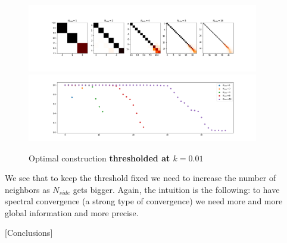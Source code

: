 \begin{figure}[h]
	\label{fig:optimal_thresholded}
	\caption{Optimal construction \textbf{thresholded at $k=0.01$}}
	\centering
	\includegraphics[width=0.9\textwidth]{../codes/02.HeatKernelGraphLaplacian/HEALPix/06_figures/optimal_thresholded.png}	
	\includegraphics[width=0.9\textwidth]{../codes/02.HeatKernelGraphLaplacian/HEALPix/06_figures/optimal_thresholded_diagonal.png}	
\end{figure}

We see that to keep the threshold fixed we need to increase the number of neighbors as $N_{side}$ gets bigger. Again, the intuition is the following: to have spectral convergence (a strong type of convergence) we need more and more global information and more precise. 

[Conclusions]

